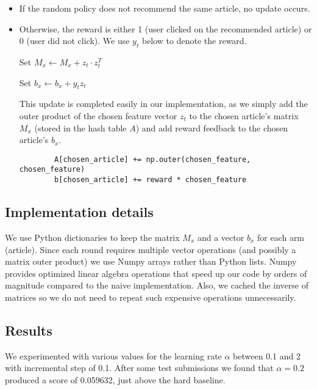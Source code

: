 \documentclass[a4paper, 11pt]{article}
\begin{document}
\begin{itemize}
    \item If the random policy does not recommend the same article, no update occurs.

    \item Otherwise, the reward is either 1 (user clicked on the recommended article) or 0 (user did not click). We use $y_t$ below to denote the reward.



    Set $M_x \leftarrow M_x + z_t \cdot z_t^T$

    Set $b_x \leftarrow b_x + y_t z_t$

    This update is completed easily in our implementation, as we simply add the outer product of the chosen feature vector $z_t$ to the chosen article's matrix $M_x$ (stored in the hash table $A$) and add reward feedback to the chosen article's $b_x$.
    \begin{verbatim}
        A[chosen_article] += np.outer(chosen_feature, chosen_feature)
        b[chosen_article] += reward * chosen_feature
    \end{verbatim}
\end{itemize}

\subsection{Implementation details}

We use Python dictionaries to keep the matrix $M_x$ and a vector $b_x$ for each arm (article). Since each round requires multiple vector operations (and possibly a matrix outer product) we use Numpy arrays rather than Python lists. Numpy provides optimized linear algebra operations that speed up our code by orders of magnitude compared to the naive implementation. Also, we cached the inverse of matrices so we do not need to repeat such expensive operations unnecessarily.

\subsection{Results}

We experimented with various values for the learning rate $\alpha$ between 0.1 and 2 with incremental step of 0.1. After some test submissions we found that $\alpha = 0.2$ produced a score of 0.059632, just above the hard baseline.
\end{document}

